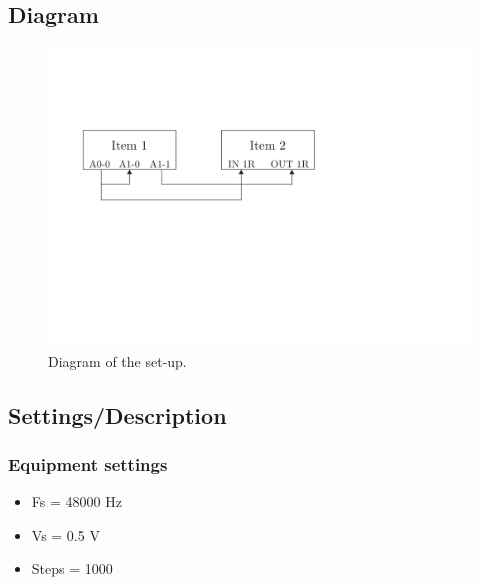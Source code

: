 \subsection{Diagram}
\begin{figure}[H]
	\centering
	\includegraphics{../Journal/Experiments/Figures/FIRFilterTestSetup}
	\caption{Diagram of the set-up.}
	\label{Fig:FIRSetupDiagram}
\end{figure}


\subsection{Settings/Description}
\subsubsection{Equipment settings}
\label{Eqp_Sett_FIR}
\begin{itemize}
	\item Fs = 48000 Hz
	\item Vs = 0.5 V
	\item Steps = 1000
\end{itemize}


